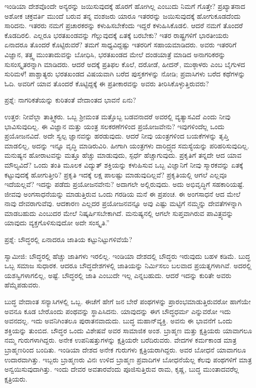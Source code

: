 ಇಂಡಿಯಾ ದೇಶವೊಂದೇ ಅನ್ಯರನ್ನು ಜಯಿಸುವುದಕ್ಕೆ ಹೊರಗೆ ಹೋಗಿಲ್ಲ ಎಂಬುದು ನಿಮಗೆ ಗೊತ್ತೇ? ಪ್ರಖ್ಯಾತನಾದ ಅಶೋಕ ಚಕ್ರವರ್ತಿ ಮುಂದೆ ಬರುವ ತನ್ನ ವಂಶಜರು ಯಾರೂ ಇತರರನ್ನು ಜಯಿಸುವುದಕ್ಕೆ ಹೋಗುಕೂಡದೆಂದು ಸಾರಿದನು. ಇತರರು ನಮಗೆ ಪ್ರಚಾರಕರನ್ನು ಕಳುಹಿಸಬೇಕೆಂದು ಇದ್ದರೆ ಕಳುಹಿಸಿಕೊಡಲಿ. ಆದರೆ ನಮಗೆ ತೊಂದರೆ ಕೊಡದಿರಲಿ. ಎಲ್ಲರೂ ಭರತಖಂಡವನ್ನು ಗೆಲ್ಲುವುದಕ್ಕೆ ಏತಕ್ಕೆ ಬರಬೇಕು? ಇತರ ರಾಷ್ಟ್ರಗಳಿಗೆ ಭಾರತೀಯರು ಏನಾದರೂ ತೊಂದರೆ ಕೊಟ್ಟಿರುವರೆ? ತಮಗೆ ಸಾಧ್ಯವಿದ್ದಷ್ಟು ಇತರರಿಗೆ ಸಹಾಯಮಾಡಿದರು. ಅವರು ಇತರರಿಗೆ ವಿಜ್ಞಾನ, ತತ್ತ್ವ ಮುಂತಾದುವನ್ನು ಬೋಧಿಸಿ, ಭರತಖಂಡದ ಮೇಲೆ ದಂಡಯಾತ್ರೆ ಮಾಡಿದ ಅನಾಗರಿಕರನ್ನು ಸುಸಂಸ್ಕೃತರನ್ನಾಗಿ ಮಾಡಿದರು. ಆದರೆ ಅದಕ್ಕೆ ಪ್ರತಿಫಲ ಕೊಲೆ, ದರೋಡೆ, ಹೀದನ್​, ಮುಠ್ಠಾಳರು ಎಂಬ ಬೈಗುಳದ ಸುರಿಮಳೆ! ಪಾಶ್ಚಾತ್ಯರು ಭರತಖಂಡದ ವಿಷಯವಾಗಿ ಬರೆದ ಪುಸ್ತಕಗಳನ್ನು ನೋಡಿ; ಪ್ರವಾಸಿಗಳು ಬರೆದ ಕಥೆಗಳನ್ನು ಓದಿ. ಅವರಿಗೆ ಯಾವ ತೊಂದರೆ ಕೊಟ್ಟಿದ್ದಕ್ಕೆ ಈ ಪ್ರತೀಕಾರವನ್ನು ಅವರು ತೀರಿಸಿಕೊಳ್ಳುತ್ತಿರುವರು?

ಪ್ರಶ್ನೆ: ನಾಗರಿಕತೆಯನ್ನು ಕುರಿತಂತೆ ವೇದಾಂತದ ಭಾವನೆ ಏನು?

ಉತ್ತರ: ನೀವೆಲ್ಲಾ ತಾತ್ತ್ವಿಕರು. ಒಬ್ಬ ಶ‍್ರೀಮಂತ ಮತ್ತೊಬ್ಬ ಬಡವನಾದರೆ ಅವರಲ್ಲಿ ವ್ಯತ್ಯಾಸವಿದೆ ಎಂದು ನೀವು ಭಾವಿಸುವುದಿಲ್ಲ. ಈ ವಿಜ್ಞಾನ ಮತ್ತು ಯಂತ್ರ ಸಲಕರಣೆಗಳಿಂದ ಪ್ರಯೋಜವೇನು? ಇವುಗಳಿಂದೆಲ್ಲ ಒಂದು ಪ್ರಯೋಜನವಿದೆ. ಅದೇ ಸ್ವಲ್ಪ ಜ್ಞಾನವನ್ನು ಹರಡುವುದು. ಆದರೆ ನೀವು ಯಂತ್ರಗಳಿಂದ ಬಯಕೆಗಳನ್ನು ತೃಪ್ತಿ ಮಾಡಲಿಲ್ಲ, ಅದನ್ನು ಇನ್ನೂ ವೃದ್ಧಿ ಮಾಡಿರುವಿರಿ. ಹೀಗಾಗಿ ಯಂತ್ರಗಳು ದಾರಿದ್ರ್ಯದ ಸಮಸ್ಯೆಯನ್ನು ಪರಿಹರಿಸುವುದಿಲ್ಲ. ಮನುಷ್ಯನ ಹೋರಾಟವನ್ನು ಮತ್ತೂ ಹೆಚ್ಚು ಮಾಡುವುದು, ಸ್ಪರ್ಧೆ ಹೆಚ್ಚಾಗುವುದು. ಪ್ರಕೃತಿಗೆ ತನ್ನದೇ ಆದ ಯಾವ ಮೌಲ್ಯವಿದೆ? ಒಂದು ತಂತಿ ಮೂಲಕ ವಿದ್ಯುತ್​ ಶಕ್ತಿಯನ್ನು ಕಳುಹಿಸುವ ಒಬ್ಬ ವಿಜ್ಞಾನಿಗೆ ನೀವು ಸ್ಮಾರಕವನ್ನು ಏತಕ್ಕೆ ಕಟ್ಟುವುದಕ್ಕೆ ಹೋಗುತ್ತೀರಿ? ಪ್ರಕೃತಿ ಇದಕ್ಕೆ ಲಕ್ಷ ಪಾಲಷ್ಟು ಮಾಡುವುದಿಲ್ಲವೆ? ಪ್ರಕೃತಿಯಲ್ಲಿ ಆಗಲೆ ಎಲ್ಲವೂ ಇದೆಯಲ್ಲವೆ? ಇದನ್ನು ಪಡೆದು ಪ್ರಯೋಜನವೇನು? ಅದಾಗಲೇ ಅಲ್ಲಿರುವುದು. ಅದು ಅಭಿವೃದ್ಧಿಗೆ ಸಹಕಾರಿಯಷ್ಟೆ. ಜೀವವು ಅಂಗಸಾಧನೆಯನ್ನು ಮಾಡುತ್ತಿರುವ ಒಂದು ಗರಡಿಯ ಮನೆ ಈ ಪ್ರಪಂಚ. ಈ ಅಂಗಸಾಧನೆ ಆದ ಮೇಲೆ ನಾವು ದೇವರಾಗುವೆವು. ಆದಕಾರಣ ಎಲ್ಲದರ ಪ್ರಯೋಜನವನ್ನೂ ಅವು ಎಷ್ಟು ಮಟ್ಟಿಗೆ ನಮ್ಮನ್ನು ದೇವತೆಗಳನ್ನಾಗಿ ಮಾಡಬಹುದು ಎಂಬುದರ ಮೇಲೆ ನಿಷ್ಕರ್ಷಿಸಬೇಕಾಗಿದೆ. ಮನುಷ್ಯನಲ್ಲಿ ಆಗಲೇ ಸುಪ್ತವಾಗಿರುವ ಪಾವಿತ್ರ್ಯವನ್ನು ಯಾವುದು ವ್ಯಕ್ತಗೊಳಿಸುವುದೋ ಅದೇ ಸಂಸ್ಕೃತಿ.”

ಪ್ರಶ್ನೆ: ಬೌದ್ಧರಲ್ಲಿ ಏನಾದರೂ ಜಾತಿಯ ಕಟ್ಟುನಿಟ್ಟುಗಳಿವೆಯೆ?

ಸ್ವಾಮೀಜಿ: ಬೌದ್ಧರಲ್ಲಿ ಹೆಚ್ಚು ಜಾತಿಗಳು ಇರಲಿಲ್ಲ. ಇಂಡಿಯಾ ದೇಶದಲ್ಲಿ ಬೌದ್ಧರು ಇರುವುದು ಬಹಳ ಕಡಿಮೆ. ಬುದ್ಧ ಒಬ್ಬ ಸಮಾಜ ಸುಧಾರಕ. ಆದರೂ ಬೌದ್ಧದೇಶಗಳಲ್ಲಿ ಜಾತಿಯನ್ನು ನಿರ್ಮಿಸಲು ಬಲವಾದ ಪ್ರಯತ್ನಗಳಾಗಿವೆ. ಅದರಲ್ಲಿ ಯಶಸ್ವಿಗಳಾಗಲಿಲ್ಲ, ಅಷ್ಟೆ. ಬೌದ್ಧರಲ್ಲಿ ಜಾತಿ ಎಂಬುದೇ ಇಲ್ಲ ಎನ್ನಬಹುದು. ಆದರೆ ಇದನ್ನು ಕುರಿತೇ ಅವರು ಹೆಮ್ಮೆಪಡುವರು.

ಬುದ್ಧ ವೇದಾಂತ ಸನ್ಯಾಸಿಗಳಲ್ಲಿ ಒಬ್ಬ. ಈಚೆಗೆ ಹೇಗೆ ಜನ ಬೇರೆ ಪಂಥಗಳನ್ನು ಪ್ರಾರಂಭಮಾಡುತ್ತಿರುವರೋ ಹಾಗೆಯೇ ಅವನೂ ಕೂಡ ಬೇರೊಂದು ಪಂಥವನ್ನು ಸ್ಥಾಪಿಸಿದನು. ಯಾವುದನ್ನು ಈಗ ಬೌದ್ಧಧರ್ಮ ಎನ್ನುವರೋ ಇದು ಅವನದಲ್ಲ. ಇದು ಅವನಿಗಿಂತಲೂ ಪುರಾತನವಾದುದು. ಬುದ್ಧ ಮಹಾನ್​ವ್ಯಕ್ತಿ. ಅವನು ಈ ಭಾವನೆಗೆ ಒಂದು ಶಕ್ತಿಯನ್ನು ತುಂಬಿದ. ಬೌದ್ಧರ ಒಂದು ವಿಶೇಷವೆ ಅವರ ಸಾಮಾಜಿಕ ಅಂಶ. ಬ್ರಾಹ್ಮಣ ಮತ್ತು ಕ್ಷತ್ರಿಯರು ಯಾವಾಗಲೂ ನಮ್ಮ ಗುರುಗಳಾಗಿದ್ದರು. ಅನೇಕ ಉಪನಿಷತ್ತುಗಳನ್ನು ಕ್ಷತ್ರಿಯರೇ ಬರೆದಿರುವರು. ವೇದಗಳ ಕರ್ಮಕಾಂಡ ಮಾತ್ರ ಬ್ರಾಹ್ಮಣರಿಂದ ಬಂದಿತು. ಇಂಡಿಯಾ ದೇಶದ ಅನೇಕ ಗುರುಗಳು ಕ್ಷತ್ರಿಯರಾಗಿದ್ದರು. ಅವರ ಬೋಧನೆ ಯಾವಾಗಲೂ ಉದಾರವಾಗಿತ್ತು. ಇಬ್ಬರು ಬ್ರಾಹ್ಮಣರು ವಿನಃ ಉಳಿದ ಬ್ರಾಹ್ಮಣ ಪ್ರವಾದಿಗಳ ಬೋಧನೆಯೆಲ್ಲ ಕೆಲವು ಪಂಥಗಳಿಗೆ ಮಾತ್ರ ಅನ್ವಯಿಸುವುದಾಗಿತ್ತು. ಇಂದು ದೇವರ ಅವತಾರವೆಂದು ಪೂಜಿಸುತ್ತಿರುವ ರಾಮ, ಕೃಷ್ಣ, ಬುದ್ಧ ಮುಂತಾದವರೆಲ್ಲ ಕ್ಷತ್ರಿಯರು.

